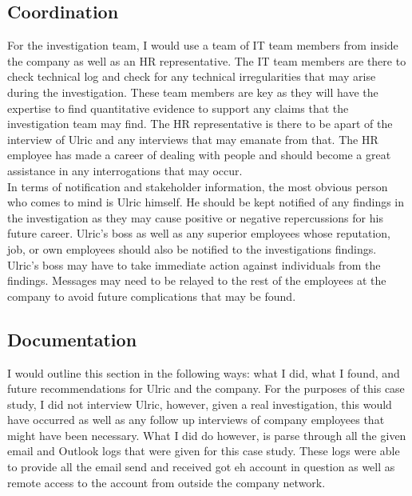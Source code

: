 \documentclass[paper=a4, fontsize=11pt]{scrartcl} %
\numberwithin{equation}{section} %
\numberwithin{figure}{section} %
\numberwithin{table}{section} %
\begin{document}
\subsection{Coordination}
For the investigation team, I would use a team of IT team members from inside the company as
well as an HR representative. The IT team members are there to check technical log and check
for any technical irregularities that may arise during the investigation. These team members are
key as they will have the expertise to find quantitative evidence to support any claims that
the investigation team may find. The HR representative is there to be apart of the interview of
Ulric and any interviews that may emanate from that. The HR employee has made a career of dealing
with people and should become a great assistance in any interrogations that may occur.\\

In terms of notification and stakeholder information, the most obvious person who comes to mind
is Ulric himself. He should be kept notified of any findings in the investigation as they may
cause positive or negative repercussions for his future career. Ulric's boss as well as any 
superior employees whose reputation, job, or own employees should also be notified to the
investigations findings. Ulric's boss may have to take immediate action against individuals
from the findings. Messages may need to be relayed to the rest of the employees at the company
to avoid future complications that may be found.


\subsection{Documentation}
I would outline this section in the following ways: what I did, what I found, and future
recommendations for Ulric and the company. For the purposes of this case study, I did not
interview Ulric, however, given a real investigation, this would have occurred as well as any
follow up interviews of company employees that might have been necessary. What I did do however,
is parse through all the given email and Outlook logs that were given for this case study. These
logs were able to provide all the email send and received got eh account in question as well as
remote access to the account from outside the company network.\\ 
\end{document}
